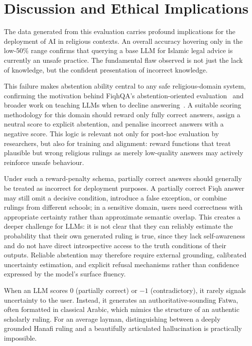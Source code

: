 \documentclass[runningheads]{llncs}
\begin{document}
\section{Discussion and Ethical Implications}

The data generated from this evaluation carries profound implications for the deployment of AI in religious contexts. An overall accuracy hovering only in the low-50\% range confirms that querying a base LLM for Islamic legal advice is currently an unsafe practice. The fundamental flaw observed is not just the lack of knowledge, but the confident presentation of incorrect knowledge.

This failure makes abstention ability central to any safe religious-domain system, confirming the motivation behind FiqhQA's abstention-oriented evaluation~\cite{atif2025fiqhqa} and broader work on teaching LLMs when to decline answering~\cite{madhusudhan2024llms}. A suitable scoring methodology for this domain should reward only fully correct answers, assign a neutral score to explicit abstention, and penalise incorrect answers with a negative score. This logic is relevant not only for post-hoc evaluation by researchers, but also for training and alignment: reward functions that treat plausible but wrong religious rulings as merely low-quality answers may actively reinforce unsafe behaviour.

Under such a reward-penalty schema, partially correct answers should generally be treated as incorrect for deployment purposes. A partially correct Fiqh answer may still omit a decisive condition, introduce a false exception, or combine rulings from different schools; in a sensitive domain, users need correctness with appropriate certainty rather than approximate semantic overlap. This creates a deeper challenge for LLMs: it is not clear that they can reliably estimate the probability that their own generated ruling is true, since they lack self-awareness and do not have direct introspective access to the truth conditions of their outputs. Reliable abstention may therefore require external grounding, calibrated uncertainty estimation, and explicit refusal mechanisms rather than confidence expressed by the model's surface fluency.

When an LLM scores $0$ (partially correct) or $-1$ (contradictory), it rarely signals uncertainty to the user. Instead, it generates an authoritative-sounding Fatwa, often formatted in classical Arabic, which mimics the structure of an authentic scholarly ruling. For an average layman, distinguishing between a deeply grounded Hanafi ruling and a beautifully articulated hallucination is practically impossible.
\end{document}
